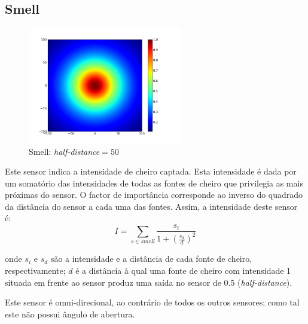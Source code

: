 \documentclass[a4paper]{article}
\begin{document}
\subsection{Smell}
\begin{figure}[h]
	\vspace{-20pt}
	\begin{center}
		\includegraphics[width=0.6\textwidth]{graphs/sensors/smell.png}
	\end{center}
	\vspace{-20pt}
	\caption{Smell: \emph{half-distance}$=50$}
\end{figure}

\indent Este sensor indica a intensidade de cheiro captada. Esta intensidade é dada por um somatório das intensidades de todas as fontes de cheiro que privilegia as mais próximas do sensor. O factor de importância corresponde ao inverso do quadrado da distância do sensor a cada uma das fontes.
Assim, a intensidade deste sensor é:
\[
	I = \displaystyle\sum\limits_{s \in smell} \frac{s_{i}}{1 + (\frac{s_{d}}{d})^{2}}
\] 

onde $s_{i}$ e $s_{d}$ são a intensidade e a distância de cada fonte de cheiro, respectivamente; $d$ é a distância à qual uma fonte de cheiro com intensidade 1 situada em frente ao sensor produz uma saída no sensor de 0.5 (\emph{half-distance}).

Este sensor é omni-direcional, ao contrário de todos os outros sensores; como tal este não possui ângulo de abertura. 

\cleardoublepage
\end{document}
